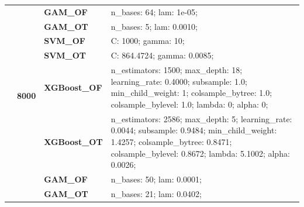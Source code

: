\documentclass[runningheads]{llncs}
\begin{document}
\begin{table}
\begin{tabularx}{\textwidth}{>{\RaggedRight\arraybackslash}m{1.6cm}p{1.225cm}p{2.05cm}>{\RaggedRight\arraybackslash}X}
        \cline{2-4}
        \textbf{}                               & \multirow[t]{7}{*}{\textbf{8000}} & \textbf{GAM\_OF}     & n\_bases: 64; lam: 1e-05;                                                                                                                                                                         \\
        \textbf{}                               & \textbf{}                         & \textbf{GAM\_OT}     & n\_bases: 5; lam: 0.0010;                                                                                                                                                                         \\
        \textbf{}                               & \textbf{}                         & \textbf{SVM\_OF}     & C: 1000; gamma: 10;                                                                                                                                                                               \\
        \textbf{}                               & \textbf{}                         & \textbf{SVM\_OT}     & C: 864.4724; gamma: 0.0085;                                                                                                                                                                       \\
        \textbf{}                               & \textbf{}                         & \textbf{XGBoost\_OF} & n\_estimators: 1500; max\_depth: 18; learning\_rate: 0.4000; subsample: 1.0; min\_child\_weight: 1; colsample\_bytree: 1.0; colsample\_bylevel: 1.0; lambda: 0; alpha: 0;                         \\
        \textbf{}                               & \textbf{}                         & \textbf{XGBoost\_OT} & n\_estimators: 2586; max\_depth: 5; learning\_rate: 0.0044; subsample: 0.9484; min\_child\_weight: 1.4257; colsample\_bytree: 0.8471; colsample\_bylevel: 0.8672; lambda: 5.1002; alpha: 0.0026;  \\
        \cline{1-4}
        \multirow[t]{14}{=}{\textbf{Friedman1}} & \multirow[t]{7}{*}{\textbf{1000}} & \textbf{GAM\_OF}     & n\_bases: 50; lam: 0.0001;                                                                                                                                                                        \\
        \textbf{}                               & \textbf{}                         & \textbf{GAM\_OT}     & n\_bases: 21; lam: 0.0402;                                                                                                                                                                        \\

\end{tabularx}
\end{table}
\end{document}
